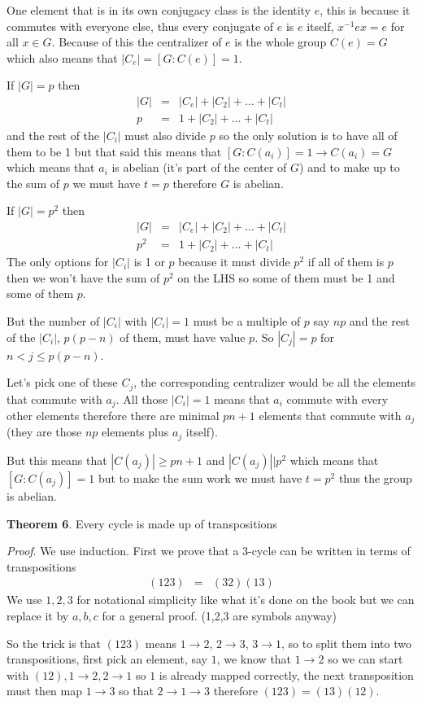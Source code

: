 \documentclass[aps,preprint,preprintnumbers,nofootinbib,showpacs,prd]{revtex4-1}
\newcommand{\nbea}{\begin{eqnarray*}}
\newcommand{\neea}{\end{eqnarray*}}
\begin{document}
One element that is in its own conjugacy class is the identity $e$, this is because it commutes with everyone else, thus every conjugate of $e$ is $e$ itself, $x^{-1} e x = e$ for all $x \in G$. Because of this the centralizer of $e$ is the whole group $C(e) = G$ which also means that $|C_e| = [G:C(e)] = 1$.

If $|G| = p$ then 
%
\nbea
|G| & = & |C_e| + |C_2| + \dots + |C_t| \\
p & = & 1 + |C_2| + \dots + |C_t|
\neea
%
and the rest of the $|C_i|$ must also divide $p$ so the only solution is to have all of them to be 1 but that said this means that $[G:C(a_i)] = 1 \to C(a_i) = G$ which means that $a_i$ is abelian (it's part of the center of $G$) and to make up to the sum of $p$ we must have $t = p$ therefore $G$ is abelian.

If $|G| = p^2$ then 
%
\nbea
|G| & = & |C_e| + |C_2| + \dots + |C_t| \\
p^2 & = & 1 + |C_2| + \dots + |C_t|
\neea
%
The only options for $|C_i|$ is 1 or $p$ because it must divide $p^2$ if all of them is $p$ then we won't have the sum of $p^2$ on the LHS so some of them must be 1 and some of them $p$.

But the number of $|C_i|$ with $|C_i| = 1$ must be a multiple of $p$ say $np$ and the rest of the $|C_i|$, $p(p - n)$ of them, must have value $p$. So $|C_j| = p$ for $n < j \le p(p - n)$.

Let's pick one of these $C_j$, the corresponding centralizer would be all the elements that commute with $a_j$. All those $|C_i| = 1$ means that $a_i$ commute with every other elements therefore there are minimal $pn + 1$ elements that commute with $a_j$ (they are those $np$ elements plus $a_j$ itself).

But this means that $|C(a_j)| \ge pn + 1$ and $|C(a_j)||p^2$ which means that $[G:C(a_j)] = 1$ but to make the sum work we must have $t = p^2$ thus the group is abelian.

{\bf Theorem 6}. Every cycle is made up of transpositions

{\it Proof}. We use induction. First we prove that a 3-cycle can be written in terms of transpositions
%
\nbea
(123) & = & (32)(13)
\neea
%
We use $1,2,3$ for notational simplicity like what it's done on the book but we can replace it by $a,b,c$ for a general proof. (1,2,3 are symbols anyway)

So the trick is that $(123)$ means $1 \to 2$, $2 \to 3$, $3 \to 1$, so to split them into two transpositions, first pick an element, say $1$, we know that $1 \to 2$ so we can start with $(12), 1\to2, 2\to 1$ so $1$ is already mapped correctly, the next transposition must then map $1 \to 3$ so that $2 \to 1 \to 3$ therefore $(123) = (13)(12)$.
\end{document}
